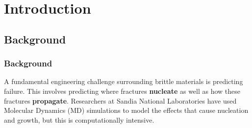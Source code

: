 \section{Introduction}
\subsection{Background}
\frame
{
\frametitle{Background}
\begin{block}{}
A fundamental engineering challenge surrounding brittle materials is predicting failure. This involves predicting where fractures \textbf{nucleate} as well as how these fractures \textbf{propagate}.
\newline
\newline
Researchers at Sandia National Laboratories have used Molecular Dynamics (MD) simulations to model the effects that cause nucleation and growth, but this is computationally intensive.
\end{block}
}




